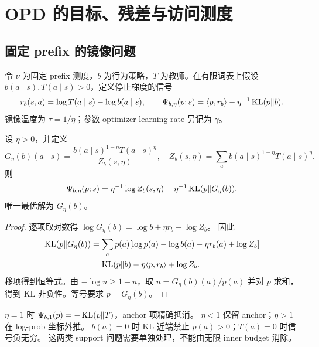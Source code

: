 \chapter{OPD 的目标、残差与访问测度}
\label{chap:opd}
\section{固定 prefix 的镜像问题}
令 $\nu$ 为固定 prefix 测度，$b$ 为行为策略，$T$ 为教师。在有限词表上假设
$b(a\mid s),T(a\mid s)>0$，定义停止梯度的信号
\[
 r_b(s,a)=\log T(a\mid s)-\log b(a\mid s),\qquad
 \Psi_{b,\eta}(p;s)=\langle p,r_b\rangle-\eta^{-1}\operatorname{KL}(p\Vert b).
\]
镜像温度为 $\tau=1/\eta$；参数 optimizer learning rate 另记为 $\gamma$。
\begin{theorem}[变分恒等式与唯一目标]\label{thm:gibbs-opd}
设 $\eta>0$，并定义
\[
 G_\eta(b)(a\mid s)=\frac{b(a\mid s)^{1-\eta}T(a\mid s)^\eta}{Z_b(s,\eta)},
 \quad Z_b(s,\eta)=\sum_a b(a\mid s)^{1-\eta}T(a\mid s)^\eta.
\]
则
\[
 \Psi_{b,\eta}(p;s)=\eta^{-1}\log Z_b(s,\eta)
                 -\eta^{-1}\operatorname{KL}(p\Vert G_\eta(b)).
\]
唯一最优解为 $G_\eta(b)$。
\end{theorem}
\begin{proof}
逐项取对数得 $\log G_\eta(b)=\log b+\eta r_b-\log Z_b$。
因此
\begin{align*}
 \operatorname{KL}(p\Vert G_\eta(b))
 &=\sum_a p(a)[\log p(a)-\log b(a)-\eta r_b(a)+\log Z_b]\\
 &=\operatorname{KL}(p\Vert b)-\eta\langle p,r_b\rangle+\log Z_b.
\end{align*}
移项得到恒等式。由 $-\log u\ge1-u$，取 $u=G_\eta(b)(a)/p(a)$
并对 $p$ 求和，得到 KL 非负性。等号要求 $p=G_\eta(b)$。
\end{proof}
$\eta=1$ 时 $\Psi_{b,1}(p)=-\operatorname{KL}(p\Vert T)$，anchor 项精确抵消。
$\eta<1$ 保留 anchor；$\eta>1$ 在 log-prob 坐标外推。
$b(a)=0$ 时 KL 近端禁止 $p(a)>0$；$T(a)=0$ 时信号负无穷。
这两类 support 问题需要单独处理，不能由无限 inner budget 消除。

